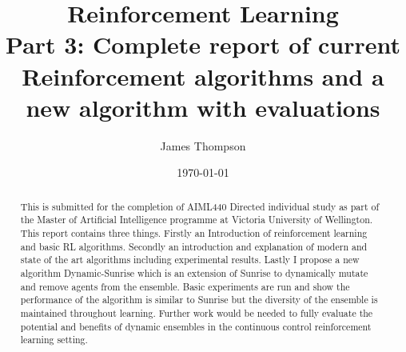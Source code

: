 \documentclass[11pt
              , a4paper
              , twoside
              , openright
              ]{report}
\title{Reinforcement Learning \\
\large Part 3: Complete report of current Reinforcement algorithms and a new algorithm with evaluations}
\author{James Thompson}
\date{\today}
\begin{document}
\frontmatter



\begin{abstract}
This is submitted for the completion of AIML440 Directed individual study as part of the Master of Artificial Intelligence programme at Victoria University of Wellington. This report contains three things. Firstly an Introduction of reinforcement learning and basic RL algorithms. Secondly an introduction and explanation of modern and state of the art algorithms including experimental results. Lastly I propose a new algorithm Dynamic-Sunrise which is an extension of Sunrise to dynamically mutate and remove agents from the ensemble. Basic experiments are run and show the performance of the algorithm is similar to Sunrise but the diversity of the ensemble is maintained throughout learning. Further work would be needed to fully evaluate the potential and benefits of dynamic ensembles in the continuous control reinforcement learning setting.
\end{abstract}


\maketitle

% 

\tableofcontents



\mainmatter
















\backmatter



%



\appendix


\end{document}
